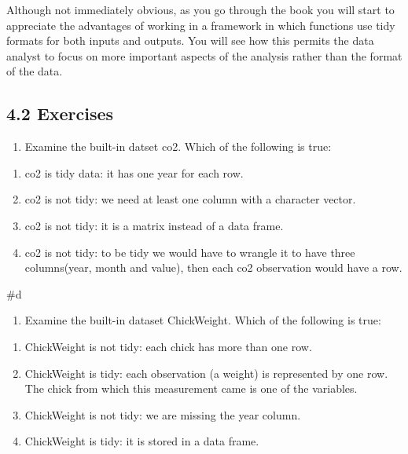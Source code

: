 \documentclass[
]{article}
\providecommand{\tightlist}{%
  \setlength{\itemsep}{0pt}\setlength{\parskip}{0pt}}
\begin{document}
Although not immediately obvious, as you go through the book you will
start to appreciate the advantages of working in a framework in which
functions use tidy formats for both inputs and outputs. You will see how
this permits the data analyst to focus on more important aspects of the
analysis rather than the format of the data.

\hypertarget{exercises}{%
\subsection{4.2 Exercises}\label{exercises}}

\begin{enumerate}
\def\labelenumi{\arabic{enumi}.}
\tightlist
\item
  Examine the built-in datset co2. Which of the following is true:
\end{enumerate}

\begin{enumerate}
\def\labelenumi{\alph{enumi}.}
\tightlist
\item
  co2 is tidy data: it has one year for each row.
\item
  co2 is not tidy: we need at least one column with a character vector.
\item
  co2 is not tidy: it is a matrix instead of a data frame.
\item
  co2 is not tidy: to be tidy we would have to wrangle it to have three
  columns(year, month and value), then each co2 observation would have a
  row.
\end{enumerate}

\#d

\begin{enumerate}
\def\labelenumi{\arabic{enumi}.}
\setcounter{enumi}{1}
\tightlist
\item
  Examine the built-in dataset ChickWeight. Which of the following is
  true:
\end{enumerate}

\begin{enumerate}
\def\labelenumi{\alph{enumi}.}
\tightlist
\item
  ChickWeight is not tidy: each chick has more than one row.
\item
  ChickWeight is tidy: each observation (a weight) is represented by one
  row. The chick from which this measurement came is one of the
  variables.
\item
  ChickWeight is not tidy: we are missing the year column.
\item
  ChickWeight is tidy: it is stored in a data frame.
\end{enumerate}
\end{document}
